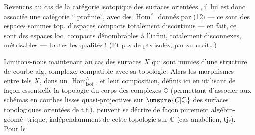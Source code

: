 Revenons au cas de la catégorie isotopique
des surfaces orientées  , il lui est donc
associée une catégorie `` profinie'',
avec des $\operatorname{Hom}^{\wedge}$ donnés par (12) --- ce sont
des espaces sommes top. d'espaces compacts
totalement discontinus --- en fait, ce sont
des espaces loc. compacts dénombrables à l'infini,
totalement disconnexes, métrisables --- toutes
les qualités ! (Et pas de pts isolés, par
surcroît\ldots)

Limitons-nous maintenant au cas des
surfaces $X$ qui sont munies d'une structure
de courbe alg. complexe, compatible avec sa
topologie. Alors les morphismes entre tels
$X$, dans un $\operatorname{Hom}^{\wedge}_{\mathrm{isot}}$, et leur composition,
définis ici en utilisant de façon essentielle
la topologie du corps des complexes $\mathbb C$
(permettant d'associer aux schémas en courbes
lisses quasi-projectives sur $\unsure{C|\mathbb C}$ des surfaces
topologiques orientées de t.f.), peuvent se
décrire de façon purement algébro-géomé-
trique, indépendamment de cette topologie
sur $\mathbb C$ (cas anabélien, tjs). Pour le

